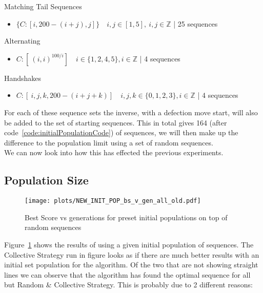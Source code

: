 Matching Tail Sequences
\begin{itemize}
    \item \(\{C:[i,200-(i+j),j]\} \quad i,j \in [1,5],\ i,j \in \mathbb{Z}\) | 25 sequences
\end{itemize}

Alternating
\begin{itemize}
    \item \(C:[\ (i,i)^{100/i}] \quad i \in \{1,2,4,5\}, i \in \mathbb{Z}\) | 4 sequences
\end{itemize}

Handshakes
\begin{itemize}
    \item \(C:[\ i,j,k,200-(i+j+k)] \quad i,j,k \in \{0,1,2,3\}, i \in \mathbb{Z}\) | 4 sequences
\end{itemize}

For each of these sequence sets the inverse, with a defection move start, will also be added to the set of starting sequences.
This in total gives 164 (after code~\ref{code:initialPopulationCode}) of sequences, we will then make up the difference to the population limit using a set of random sequences.\\

We can now look into how this has effected the previous experiments.

\subsection{Population Size}\label{subsec:populationSize}

\begin{figure}[h]
    \texttt{[image: plots/NEW\_INIT\_POP\_bs\_v\_gen\_all\_old.pdf]}
    \caption{Best Score vs generations for preset initial populations on top of random sequences}\label{fig:NEW-INIT-POP-bs-v-gen-all}
\end{figure}

Figure~\ref{fig:NEW-INIT-POP-bs-v-gen-all} shows the results of using a given initial population of sequences.
The Collective Strategy run in figure looks as if there are much better results with an initial set population for the algorithm.
Of the two that are not showing straight lines we can observe that the algorithm has found the optimal sequence for all but Random \& Collective Strategy.
This is probably due to 2 different reasons:

